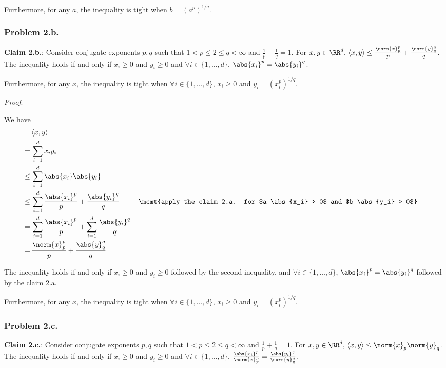 Furthermore, for any $a$, the inequality is tight when $b = (a^p)^{1/q}$.

\subsubsection*{Problem 2.b.}

\textbf{Claim 2.b.}: Consider conjugate exponents $p, q$ such that $1 < p \le 2 \le q < \infty$ and $\frac{1}{p} + \frac{1}{q} = 1$. For $x,y \in \RR^d,\, \langle x,y \rangle \le \frac{\norm{x}_p^p}{p} + \frac{\norm{y}_q^q}{q}$. The inequality holds if and only if $x_i \ge 0$ and $y_i \ge 0$ and $\forall i \in \{1,\ldots,d\}$, $\abs{x_i}^p = \abs{y_i}^q$.

Furthermore, for any $x$, the inequality is tight when $\forall i \in \{1,\ldots,d\}$, $x_i \ge 0$ and $y_i = (x_i^p)^{1/q}$. 

\textit{Proof}:

We have
\begin{align*}
  &\langle x,y \rangle \\
  =\,& \sum_{i=1}^d x_iy_i \\
  \le\,& \sum_{i=1}^d \abs{x_i}\abs{y_i} \\
  \le\,& \sum_{i=1}^d \frac{\abs{x_i}^p}{p} + \frac{\abs{y_i}^q}{q} && \mcmt{apply the claim 2.a. for $a=\abs{x_i} > 0$ and $b=\abs{y_i} > 0$}\\
  =\,& \sum_{i=1}^d \frac{\abs{x_i}^p}{p} + \sum_{i=1}^d \frac{\abs{y_i}^q}{q} \\
  =\,& \frac{\norm{x}_p^p}{p} + \frac{\abs{y}_q^q}{q}
\end{align*}

The inequality holds if and only if $x_i \ge 0$ and $y_i \ge 0$ followed by the second inequality, and $\forall i \in \{1,\ldots,d\}$, $\abs{x_i}^p = \abs{y_i}^q$ followed by the claim 2.a.

Furthermore, for any $x$, the inequality is tight when $\forall i \in \{1,\ldots,d\}$, $x_i \ge 0$ and $y_i = (x_i^p)^{1/q}$.

\subsubsection*{Problem 2.c.}

\textbf{Claim 2.c.}: Consider conjugate exponents $p, q$ such that $1 < p \le 2 \le q < \infty$ and $\frac{1}{p} + \frac{1}{q} = 1$. For $x,y \in \RR^d,\, \langle x,y \rangle \le \norm{x}_p \norm{y}_q$. The inequality holds if and only if $x_i \ge 0$ and $y_i \ge 0$ and $\forall i \in \{1,\ldots,d\}$, $\frac{\abs{x_i}^p}{\norm{x}_p^p} = \frac{\abs{y_i}^q}{\norm{y}_q^q}$.

